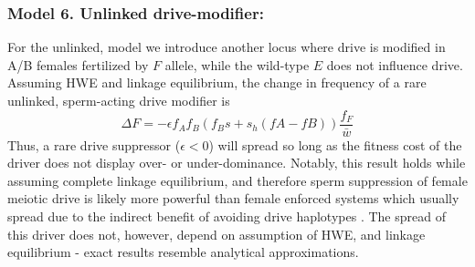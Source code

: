 \documentclass[12pt,letterpaper]{article}
\begin{document}
\subsubsection*{Model 6. Unlinked drive-modifier:}
For the unlinked, model we introduce another locus where drive is modified in A/B females fertilized by $F$ allele, 
	while the wild-type $E$ does not influence drive. 
Assuming HWE and linkage equilibrium, the change in frequency of a rare unlinked, sperm-acting drive modifier is 
\begin{equation} \Delta F =-\epsilon f_A f_B (f_B s + s_h (fA - fB) ) \frac{f_F}{\bar{w}}  \label{unlinked} \end{equation}
Thus, a rare drive suppressor ($\epsilon<0$) will spread so long as  the fitness cost of the driver does not display over- or under-dominance. 
Notably, this result holds while assuming complete linkage equilibrium, and therefore sperm suppression of female meiotic drive is likely more powerful than female enforced systems which usually spread due to the indirect benefit of avoiding drive haplotypes \citep[e.g. ][]{Brandvain2012}.  
The spread of this driver does not, however, depend on assumption of HWE, and linkage equilibrium - exact results resemble analytical approximations. 
\end{document}
